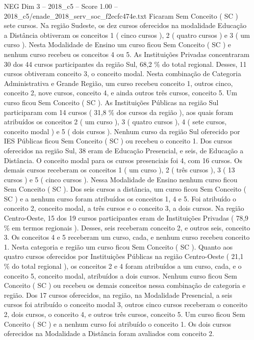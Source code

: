 \begin{textsample}{NEG Dim 3 – 2018\_c5 – Score 1.00 – 2018\_c5/enade\_2018\_serv\_soc\_f2ecfc474e.txt}
Ficaram Sem Conceito ( SC ) sete cursos.
Na região Sudeste, os dez cursos oferecidos na modalidade Educação a Distância obtiveram os conceitos 1 ( cinco cursos ), 2 ( quatro cursos ) e 3 ( um curso ).
Nesta Modalidade de Ensino um curso ficou Sem Conceito ( SC ) e nenhum curso recebeu os conceitos 4 ou 5.
As Instituições Privadas concentraram 30 dos 44 cursos participantes da região Sul, 68,2 \% do total regional.
Desses, 11 cursos obtiveram conceito 3, o conceito modal.
Nesta combinação de Categoria Administrativa e Grande Região, um curso recebeu conceito 1, outros cinco, conceito 2, nove cursos, conceito 4, e ainda outros três cursos, conceito 5.
Um curso ficou Sem Conceito ( SC ).
As Instituições Públicas na região Sul participaram com 14 cursos ( 31,8 \% dos cursos da região ), aos quais foram atribuídos os conceitos 2 ( um curso ), 3 ( quatro cursos ), 4 ( sete cursos, conceito modal ) e 5 ( dois cursos ).
Nenhum curso da região Sul oferecido por IES Públicas ficou Sem Conceito ( SC ) ou recebeu o conceito 1.
Dos cursos oferecidos na região Sul, 38 eram de Educação Presencial, e seis, de Educação a Distância.
O conceito modal para os cursos presenciais foi 4, com 16 cursos.
Os demais cursos receberam os conceitos 1 ( um curso ), 2 ( três cursos ), 3 ( 13 cursos ) e 5 ( cinco cursos ).
Nessa Modalidade de Ensino nenhum curso ficou Sem Conceito ( SC ).
Dos seis cursos a distância, um curso ficou Sem Conceito ( SC ) e a nenhum curso foram atribuídos os conceitos 1, 4 e 5.
Foi atribuído o conceito 2, conceito modal, a três cursos e o conceito 3, a dois cursos.
Na região Centro-Oeste, 15 dos 19 cursos participantes eram de Instituições Privadas ( 78,9 \% em termos regionais ).
Desses, seis receberam conceito 2, e outros seis, conceito 3.
Os conceitos 4 e 5 receberam um curso, cada, e nenhum curso recebeu conceito 1.
Nesta categoria e região um curso ficou Sem Conceito ( SC ).
Quanto aos quatro cursos oferecidos por Instituições Públicas na região Centro-Oeste ( 21,1 \% do total regional ), os conceitos 2 e 4 foram atribuídos a um curso, cada, e o conceito 5, conceito modal, atribuídos a dois cursos.
Nenhum curso ficou Sem Conceito ( SC ) ou recebeu os demais conceitos nessa combinação de categoria e região.
Dos 17 cursos oferecidos, na região, na Modalidade Presencial, a seis cursos foi atribuído o conceito modal 3, outros cinco cursos receberam o conceito 2, dois cursos, o conceito 4, e outros três cursos, conceito 5.
Um curso ficou Sem Conceito ( SC ) e a nenhum curso foi atribuído o conceito 1.
Os dois cursos oferecidos na Modalidade a Distância foram avaliados com conceito 2.

\end{textsample}
